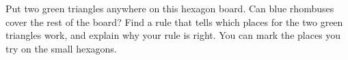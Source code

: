 \documentclass[12pt]{extarticle}
\begin{document}
\newpage
\prob Put two green triangles  anywhere on this hexagon board. Can blue rhombuses  cover the rest of the board? Find a rule that tells which places for the two green triangles work, and explain why your rule is right. You can mark the places you try on the small hexagons.

\vspace{14pt}
\begin{center}

\vspace{20pt}
\hspace{0.3in}\hspace{0.3in}\hspace{0.3in}\hspace{0.3in}

\vspace{14pt}
\hspace{0.3in}\hspace{0.3in}\hspace{0.3in}\hspace{0.3in}
\end{center}

\vspace{4pt}
\end{document}
